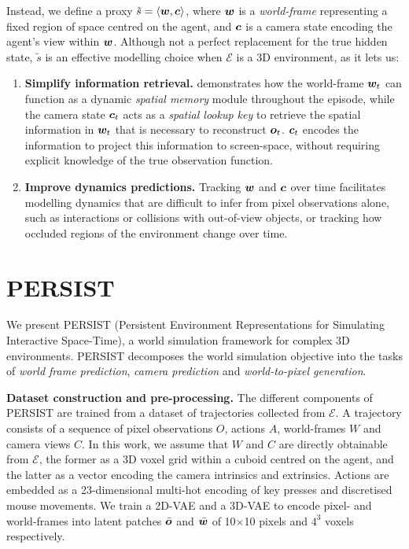 Instead, we define a proxy $\tilde{s} = \langle {\bm{w}}, {\bm{c}} \rangle$, where ${\bm{w}}$ is a \textit{world-frame} representing a fixed region of space centred on the agent, and ${\bm{c}}$ is a camera state encoding the agent's view within ${\bm{w}}$.
Although not a perfect replacement for the true hidden state, $\tilde{s}$ is an effective modelling choice when $\mathcal{E}$ is a 3D environment, as it lets us:
\begin{enumerate}[leftmargin=*,nosep]
    \item \textbf{Simplify information retrieval.}  demonstrates how the world-frame ${\bm{w}}_t$ can function as a dynamic \textit{spatial memory} module throughout the episode, while the camera state ${\bm{c}}_t$ acts as a \textit{spatial lookup key} to retrieve the spatial information in ${\bm{w}}_t$ that is necessary to reconstruct ${\bm{o}}_t$. ${\bm{c}}_t$ encodes the information to project this information to screen-space, without requiring explicit knowledge of the true observation function.
    \item \textbf{Improve dynamics predictions.} Tracking ${\bm{w}}$ and ${\bm{c}}$ over time facilitates modelling dynamics that are difficult to infer from pixel observations alone, such as interactions or collisions with out-of-view objects, or tracking how occluded regions of the environment change over time.
\end{enumerate}



\vspace{-0.26cm}
\section{PERSIST}
We present PERSIST (Persistent Environment Representations for Simulating Interactive Space-Time), a world simulation framework for complex 3D environments.
PERSIST decomposes the world simulation objective into the tasks of \textit{world frame prediction}, \textit{camera prediction} and \textit{world-to-pixel generation}.

\textbf{Dataset construction and pre-processing.} The different components of PERSIST are trained from a dataset of trajectories collected from $\mathcal{E}$.
A trajectory consists of a sequence of pixel observations $O$, actions $A$, world-frames $W$ and camera views $C$.
In this work, we assume that $W$ and $C$ are directly obtainable from $\mathcal{E}$, the former as a 3D voxel grid within a cuboid centred on the agent, and the latter as a vector encoding the camera intrinsics and extrinsics.
Actions are embedded as a 23-dimensional multi-hot encoding of key presses and discretised mouse movements.
We train a 2D-VAE and a 3D-VAE to encode pixel- and world-frames into latent patches $\bar{{\bm{o}}}$ and $\bar{{\bm{w}}}$ of 10$\times$10 pixels and $4^3$ voxels respectively. 

